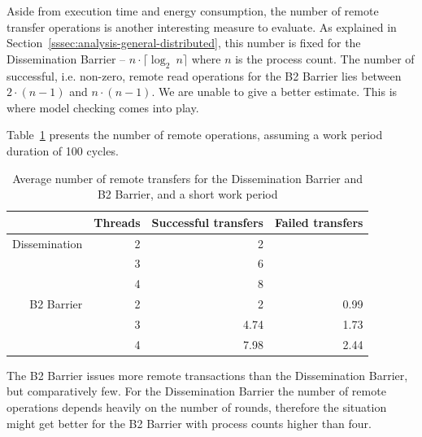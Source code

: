 \documentclass[a4paper, 10pt]{article}
\begin{document}
Aside from execution time and energy consumption, the number of remote transfer operations is another interesting measure to evaluate.
As explained in Section~\ref{sssec:analysis-general-distributed}, this number is fixed for the Dissemination Barrier -- $n \cdot \lceil \log _2~n \rceil$ where $n$ is the process count.
The number of successful, i.e. non-zero, remote read operations for the B2 Barrier lies between $2 \cdot (n-1)$ and $n \cdot (n-1)$. We are unable to give a better estimate. This is where model checking comes into play.

Table~\ref{tab:d2-transfers-100} presents the number of remote operations, assuming a work period duration of 100 cycles.
\begin{table}[htbp]
	\centering
	\caption{Average number of remote transfers for the Dissemination Barrier and B2 Barrier, and a short work period}
	\vspace{0.2cm}
	\begin{tabular}{r | r | r r}
					  & Threads & Successful transfers & Failed transfers \\
		\hline
		Dissemination & 2       & 2                     &                 \\
					  & 3       & 6                     &                 \\
					  & 4       & 8                     &                 \\
		\hline
		B2 Barrier    & 2       & 2                     & 0.99            \\
					  & 3       & 4.74                  & 1.73            \\
					  & 4       & 7.98                  & 2.44            \\
	\end{tabular}
	\label{tab:d2-transfers-100}
\end{table}
The B2 Barrier issues more remote transactions than the Dissemination Barrier, but comparatively few.
For the Dissemination Barrier the number of remote operations depends heavily on the number of rounds, therefore the situation might get better for the B2 Barrier with process counts higher than four.
\end{document}
